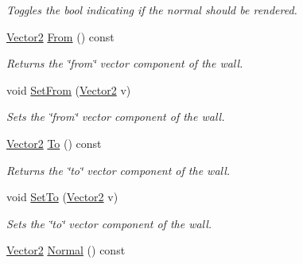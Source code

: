 \begin{DoxyCompactItemize}
\begin{DoxyCompactList}\small\item\em Toggles the bool indicating if the normal should be rendered. \end{DoxyCompactList}\item 
\hypertarget{classsteer_1_1_wall_a62e24f1cc85321908c56772d08fa8ae3}{\hyperlink{structsteer_1_1_vector2}{Vector2} \hyperlink{classsteer_1_1_wall_a62e24f1cc85321908c56772d08fa8ae3}{From} () const }\label{classsteer_1_1_wall_a62e24f1cc85321908c56772d08fa8ae3}

\begin{DoxyCompactList}\small\item\em Returns the \char`\"{}from\char`\"{} vector component of the wall. \end{DoxyCompactList}\item 
void \hyperlink{classsteer_1_1_wall_a314c755107a5b121a690933b122c809f}{Set\-From} (\hyperlink{structsteer_1_1_vector2}{Vector2} v)
\begin{DoxyCompactList}\small\item\em Sets the \char`\"{}from\char`\"{} vector component of the wall. \end{DoxyCompactList}\item 
\hypertarget{classsteer_1_1_wall_a7d49edcd3acaea59d678a1d2cde97729}{\hyperlink{structsteer_1_1_vector2}{Vector2} \hyperlink{classsteer_1_1_wall_a7d49edcd3acaea59d678a1d2cde97729}{To} () const }\label{classsteer_1_1_wall_a7d49edcd3acaea59d678a1d2cde97729}

\begin{DoxyCompactList}\small\item\em Returns the \char`\"{}to\char`\"{} vector component of the wall. \end{DoxyCompactList}\item 
void \hyperlink{classsteer_1_1_wall_ae075385ee94169c174654a90dea59c4e}{Set\-To} (\hyperlink{structsteer_1_1_vector2}{Vector2} v)
\begin{DoxyCompactList}\small\item\em Sets the \char`\"{}to\char`\"{} vector component of the wall. \end{DoxyCompactList}\item 
\hypertarget{classsteer_1_1_wall_a275e43243deb1ba7e71d0d267cb7b205}{\hyperlink{structsteer_1_1_vector2}{Vector2} \hyperlink{classsteer_1_1_wall_a275e43243deb1ba7e71d0d267cb7b205}{Normal} () const }\label{classsteer_1_1_wall_a275e43243deb1ba7e71d0d267cb7b205}


\end{DoxyCompactItemize}
